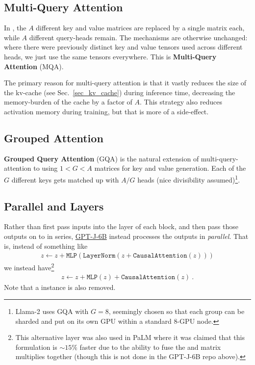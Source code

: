 \documentclass[11pt]{article}
\begin{document}
\subsection{Multi-Query Attention \label{subsec_multi_query_attn}}

In \cite{shazeer2019fast}, the $ A $ different key and value matrices are replaced by a single
matrix each, while $ A$ different query-heads remain. The mechanisms are otherwise unchanged: where
there were previously distinct key and value tensors used across different heads, we just use the same
tensors everywhere. This is \textbf{Multi-Query Attention} (MQA).


The primary reason for multi-query attention is that it vastly reduces the size of the kv-cache (see
Sec.~\ref{sec_kv_cache}) during inference time, decreasing the memory-burden of the cache by a
factor of $ A $. This strategy also reduces activation memory during training, but that is more of a
side-effect.

\subsection{Grouped Attention \label{subsec_grouped_attn}}

\textbf{Grouped Query Attention} (GQA) \cite{ainslie2023gqa} is the natural extension of
multi-query-attention to using $ 1<G<A $ matrices for key and value generation. Each of the $G$
different keys gets matched up with $A/G$ heads (nice divisibility assumed)\footnote{Llama-2
    \cite{touvron2023llama2} uses GQA with $ G=8 $, seemingly chosen so that each group can be
sharded and put on its own GPU within a standard 8-GPU node.}.


\subsection{Parallel  and  Layers}

Rather than first pass inputs into the  layer of each block, and then pass
those outputs on to  in series, \href{https://github.com/kingoflolz/mesh-transformer-jax/blob/f8315e3003033b23f21d78361b288953064e0e76/mesh_transformer/layers.py#L303}{GPT-J-6B}
instead processes the  outputs in \textit{parallel}. That is, instead of something
like
\begin{align}
	z \leftarrow z + \texttt{MLP}\left ( \texttt{LayerNorm}\left ( z + \texttt{CausalAttention}\left ( z \right ) \right ) \right )
\end{align}
we instead have\footnote{This alternative layer was also used in PaLM \cite{chowdhery2022palm} where it
	was claimed that this formulation is $\sim 15\%$ faster due to the ability to fuse the 
	and  matrix multiplies together (though this is not done in the GPT-J-6B repo above).}
\begin{align}
	z \leftarrow z + \texttt{MLP}\left ( z \right )    + \texttt{CausalAttention}\left ( z \right )\ .
\end{align}
Note that a  instance is also removed.
\end{document}
